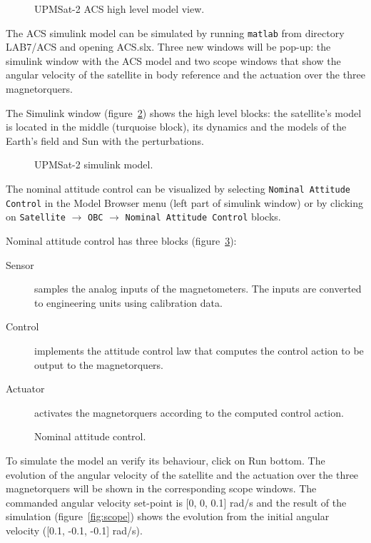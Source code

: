 \begin{figure}[h]
            \caption{UPMSat-2 ACS high level model view.}
            \label{fig:acs-hl}
\end{figure}

The ACS simulink model can be simulated by running {\tt matlab} from directory LAB7/ACS and opening ACS.slx. Three new windows will be pop-up: the simulink window with the ACS model and two scope windows that show the angular velocity of the satellite in body reference and the actuation over the three magnetorquers.

The Simulink window (figure~\ref{fig:acs-simulink}) shows the high level blocks: the satellite's model is located in the middle (turquoise block),
its dynamics and the models of the Earth's field and Sun with the perturbations.

\begin{figure}[h]
            \caption{UPMSat-2 simulink model.}
            \label{fig:acs-simulink}
\end{figure}

The nominal attitude control can be visualized by selecting {\tt Nominal Attitude Control} in the Model Browser menu (left part of simulink window) or by clicking on {\tt Satellite} $\rightarrow$ {\tt OBC} $\rightarrow$ {\tt Nominal Attitude Control} blocks.

Nominal attitude control has three blocks (figure~\ref{fig:nac}):
\begin{description}
\item[Sensor] samples the analog inputs of the magnetometers. The inputs are converted to engineering units using calibration data.
\item[Control] implements the attitude control law that computes the control action to be output to the magnetorquers.
\item[Actuator] activates the magnetorquers according to the computed control action.
\end{description}

\begin{figure}[H]
            \caption{Nominal attitude control.}
            \label{fig:nac}
\end{figure}

To simulate the model an verify its behaviour,
click on Run bottom.
The evolution of the angular velocity of the satellite
and the actuation over the three magnetorquers will be shown in the corresponding scope windows.
The commanded angular velocity set-point is [0, 0, 0.1] rad/s
and the result of the simulation (figure~\ref{fig:scope})
shows the evolution from the initial angular velocity ([0.1, -0.1, -0.1] rad/s).

